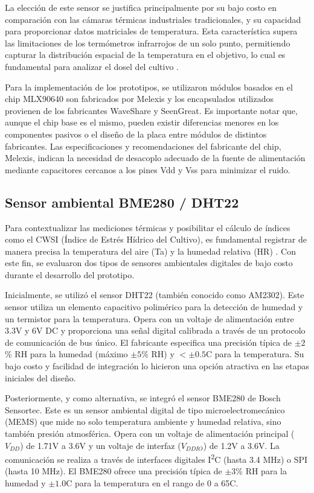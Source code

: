     La elección de este sensor se justifica principalmente por su bajo costo en comparación con las cámaras térmicas industriales tradicionales, y su capacidad para proporcionar datos matriciales de temperatura. Esta característica supera las limitaciones de los termómetros infrarrojos de un solo punto, permitiendo capturar la distribución espacial de la temperatura en el objetivo, lo cual es fundamental para analizar el dosel del cultivo . 

    Para la implementación de los prototipos, se utilizaron módulos basados en el chip MLX90640 son fabricados por Melexis y los encapsulados utilizados provienen de los fabricantes WaveShare y SeenGreat. Es importante notar que, aunque el chip base es el mismo, pueden existir diferencias menores en los componentes pasivos o el diseño de la placa entre módulos de distintos fabricantes. Las especificaciones y recomendaciones del fabricante del chip, Melexis, indican la necesidad de desacoplo adecuado de la fuente de alimentación mediante capacitores cercanos a los pines Vdd y Vss para minimizar el ruido.

    \subsection{Sensor ambiental BME280 / DHT22}
    \label{subsec:hardware_sensores_amb}
    Para contextualizar las mediciones térmicas y posibilitar el cálculo de índices como el CWSI (Índice de Estrés Hídrico del Cultivo), es fundamental registrar de manera precisa la temperatura del aire (Ta) y la humedad relativa (HR) . Con este fin, se evaluaron dos tipos de sensores ambientales digitales de bajo costo durante el desarrollo del prototipo.

    Inicialmente, se utilizó el sensor DHT22 (también conocido como AM2302). Este sensor utiliza un elemento capacitivo polimérico para la detección de humedad y un termistor para la temperatura. Opera con un voltaje de alimentación entre 3.3V y 6V DC y proporciona una señal digital calibrada a través de un protocolo de comunicación de bus único. El fabricante especifica una precisión típica de $\pm2$\% RH para la humedad (máximo $\pm5$\% RH) y $<\pm0.5$\degree C para la temperatura. Su bajo costo y facilidad de integración lo hicieron una opción atractiva en las etapas iniciales del diseño.

    Posteriormente, y como alternativa, se integró el sensor BME280 de Bosch Sensortec. Este es un sensor ambiental digital de tipo microelectromecánico (MEMS) que mide no solo temperatura ambiente y humedad relativa, sino también presión atmosférica. Opera con un voltaje de alimentación principal ($V_{DD}$) de 1.71V a 3.6V y un voltaje de interfaz ($V_{DDIO}$) de 1.2V a 3.6V. La comunicación se realiza a través de interfaces digitales I\textsuperscript{2}C (hasta 3.4 MHz) o SPI (hasta 10 MHz). El BME280 ofrece una precisión típica de $\pm3$\% RH para la humedad y $\pm1.0$\degree C para la temperatura en el rango de 0 a 65\degree C.

